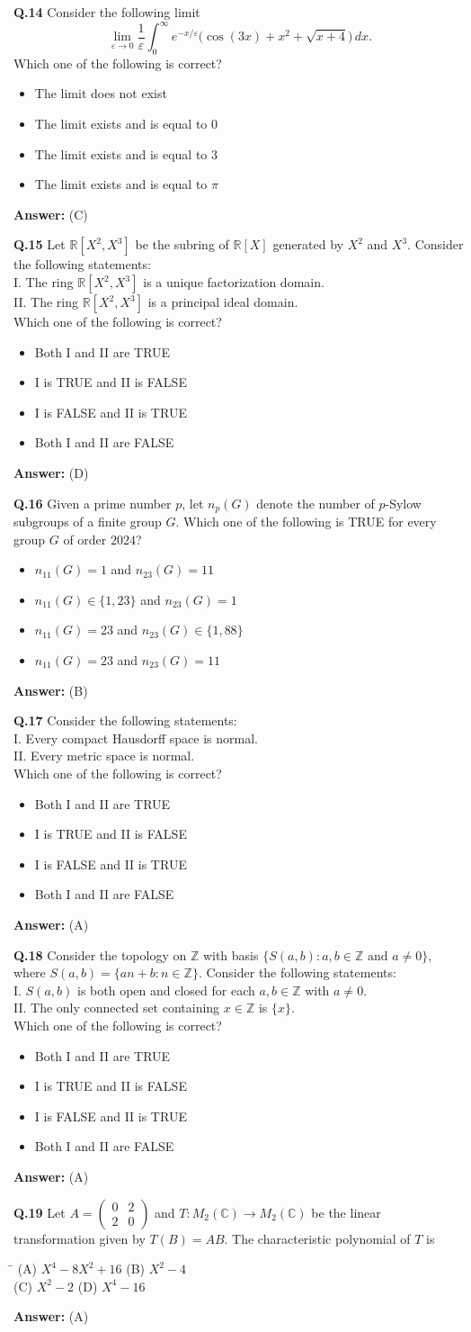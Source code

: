 \documentclass[11pt,a4paper]{article}
\newcommand{\optsfourA}[4]{%
  \begin{tabbing}
    \hspace{0.48\linewidth}\=\kill
    (A) #1 \> (B) #2 \\[2pt]
    (C) #3 \> (D) #4
  \end{tabbing}%
}
\newcommand{\optslistA}[4]{%
  \begin{itemize}
    \setlength{\itemsep}{2pt}\setlength{\parskip}{0pt}
    \item[(A)] #1
    \item[(B)] #2
    \item[(C)] #3
    \item[(D)] #4
  \end{itemize}%
}
\newcommand{\ans}[1]{\textbf{Answer:} #1\par\medskip}
\begin{document}
\textbf{Q.14} Consider the following limit
\[
  \lim_{\varepsilon \to 0} \frac{1}{\varepsilon} \int_0^\infty e^{-x/\varepsilon} \bigl(\cos(3x) + x^2 + \sqrt{x + 4}\bigr)\,dx.
\]
Which one of the following is correct?
\optslistA{The limit does not exist}{The limit exists and is equal to $0$}{The limit exists and is equal to $3$}{The limit exists and is equal to $\pi$}
\ans{(C)}

\textbf{Q.15} Let $\mathbb{R}[X^2, X^3]$ be the subring of $\mathbb{R}[X]$ generated by $X^2$ and $X^3$. Consider the following statements:\\
I. The ring $\mathbb{R}[X^2, X^3]$ is a unique factorization domain.\\
II. The ring $\mathbb{R}[X^2, X^3]$ is a principal ideal domain.\\
Which one of the following is correct?
\optslistA{Both I and II are TRUE}{I is TRUE and II is FALSE}{I is FALSE and II is TRUE}{Both I and II are FALSE}
\ans{(D)}

\textbf{Q.16} Given a prime number $p$, let $n_p(G)$ denote the number of $p$-Sylow subgroups of a finite group $G$. Which one of the following is TRUE for every group $G$ of order $2024$?
\optslistA{$n_{11}(G) = 1$ and $n_{23}(G) = 11$}{$n_{11}(G) \in \{1, 23\}$ and $n_{23}(G) = 1$}{$n_{11}(G) = 23$ and $n_{23}(G) \in \{1, 88\}$}{$n_{11}(G) = 23$ and $n_{23}(G) = 11$}
\ans{(B)}

\textbf{Q.17} Consider the following statements:\\
I. Every compact Hausdorff space is normal.\\
II. Every metric space is normal.\\
Which one of the following is correct?
\optslistA{Both I and II are TRUE}{I is TRUE and II is FALSE}{I is FALSE and II is TRUE}{Both I and II are FALSE}
\ans{(A)}

\textbf{Q.18} Consider the topology on $\mathbb{Z}$ with basis $\{S(a, b) : a, b \in \mathbb{Z} \text{ and } a \ne 0\}$, where $S(a, b) = \{an + b : n \in \mathbb{Z}\}$. Consider the following statements:\\
I. $S(a, b)$ is both open and closed for each $a, b \in \mathbb{Z}$ with $a \ne 0$.\\
II. The only connected set containing $x \in \mathbb{Z}$ is $\{x\}$.\\
Which one of the following is correct?
\optslistA{Both I and II are TRUE}{I is TRUE and II is FALSE}{I is FALSE and II is TRUE}{Both I and II are FALSE}
\ans{(A)}

\textbf{Q.19} Let $A = \begin{pmatrix} 0 & 2 \\ 2 & 0 \end{pmatrix}$ and $T : M_2(\mathbb{C}) \to M_2(\mathbb{C})$ be the linear transformation given by $T(B) = AB$. The characteristic polynomial of $T$ is
\optsfourA{$X^4 - 8X^2 + 16$}{$X^2 - 4$}{$X^2 - 2$}{$X^4 - 16$}
\ans{(A)}
\end{document}
